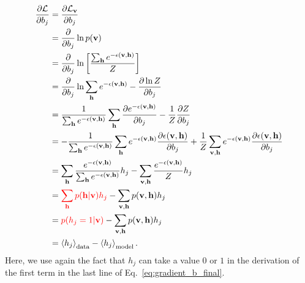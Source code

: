 \documentclass[10pt, a4paper]{article}
\begin{document}
\begin{align}
  \frac{\partial \mathcal{L}}{\partial b_j} &= \dfrac{\partial \mathcal{L}_{\mathbf{v}}}{\partial b_j} \nonumber \\
  &= \dfrac{\partial}{\partial b_j} \ln p(\mathbf{v}) \nonumber \\
  &= \dfrac{\partial}{\partial b_j} \ln \left[\dfrac{\sum_{\mathbf{h}}
        e^{-\epsilon(\mathbf{v}, \mathbf{h})}}{Z}\right] \nonumber \\
  &= \dfrac{\partial}{\partial b_j} \ln \sum_{\mathbf{h}}
        e^{-\epsilon(\mathbf{v}, \mathbf{h})}
        - \dfrac{\partial  \ln Z}{\partial b_j} \nonumber \\
  &= \dfrac{1}{\sum_{\mathbf{h}} e^{-\epsilon(\mathbf{v}, \mathbf{h})}} \sum_{\mathbf{h}}
        \dfrac{\partial e^{-\epsilon(\mathbf{v}, \mathbf{h})}}{\partial b_j}
        - \dfrac{1}{Z} \dfrac{\partial Z}{\partial b_j} \nonumber \\
  &= -\dfrac{1}{\sum_{\mathbf{h}} e^{-\epsilon(\mathbf{v}, \mathbf{h})}} \sum_{\mathbf{h}} e^{-\epsilon(\mathbf{v}, \mathbf{h})}
      \dfrac{\partial \epsilon(\mathbf{v}, \mathbf{h})}{\partial b_j}
        + \dfrac{1}{Z} \sum_{\mathbf{v}, \mathbf{h}} e^{-\epsilon(\mathbf{v},\mathbf{h})}
        \dfrac{\partial \epsilon(\mathbf{v}, \mathbf{h})}{\partial b_j} \nonumber \\
  &= \sum_{\mathbf{h}} \dfrac{e^{-\epsilon(\mathbf{v}, \mathbf{h})}}{\sum_{\mathbf{h}} e^{-\epsilon(\mathbf{v}, \mathbf{h})}} h_j
        - \sum_{\mathbf{v}, \mathbf{h}} \dfrac{e^{-\epsilon(\mathbf{v},\mathbf{h})}}{Z} h_j \nonumber \\
  &= \textcolor{red}{\sum_{\mathbf{h}} p(\mathbf{h}|\mathbf{v}) h_j} - \sum_{\mathbf{v}, \mathbf{h}}
      p(\mathbf{v},\mathbf{h}) h_j \nonumber \\
  &= \textcolor{red}{p(h_j=1|\mathbf{v})} - \sum_{\mathbf{v}, \mathbf{h}} p(\mathbf{v},\mathbf{h}) h_j \nonumber \\
  &=\left<h_j\right>_{\text{data}} - \left<h_j\right>_{\text{model}}.  \label{eq:gradient_b_final}
\end{align}
Here, we use again the fact that $h_j$ can take a value $0$ or $1$
in the derivation of the first term in the last line of Eq.~\eqref{eq:gradient_b_final}.
\end{document}
